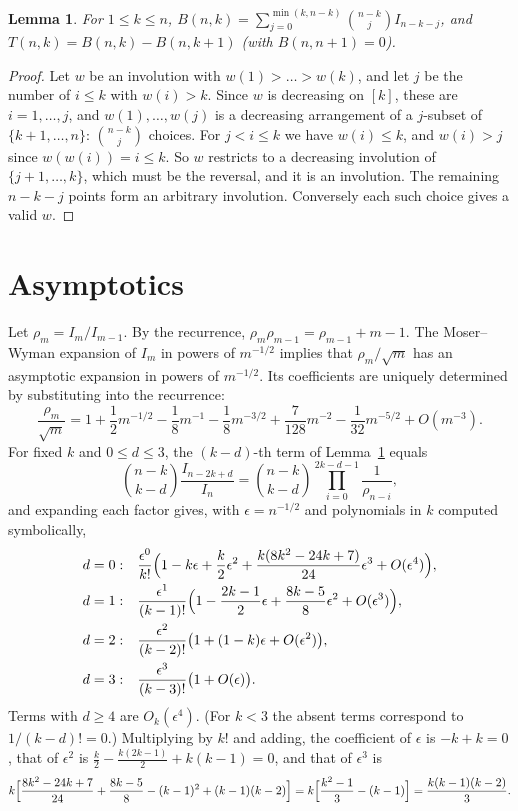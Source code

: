 \documentclass[11pt,a4paper]{article}
\newtheorem{lemma}[theorem]{Lemma}
\theoremstyle{remark}
\begin{document}
\begin{lemma}\label{lem:formula}
For $1\le k\le n$, $\displaystyle B(n,k)=\sum_{j=0}^{\min(k,n-k)}\binom{n-k}{j}I_{n-k-j}$, and $T(n,k)=B(n,k)-B(n,k+1)$ (with $B(n,n+1)=0$).
\end{lemma}

\begin{proof}
Let $w$ be an involution with $w(1)>\dots>w(k)$, and let $j$ be the number of $i\le k$ with $w(i)>k$. Since $w$ is decreasing on $[k]$, these are $i=1,\dots,j$, and $w(1),\dots,w(j)$ is a decreasing arrangement of a $j$-subset of $\{k+1,\dots,n\}$: $\binom{n-k}j$ choices. For $j<i\le k$ we have $w(i)\le k$, and $w(i)>j$ since $w(w(i))=i\le k$. So $w$ restricts to a decreasing involution of $\{j+1,\dots,k\}$, which must be the reversal, and it is an involution. The remaining $n-k-j$ points form an arbitrary involution. Conversely each such choice gives a valid $w$.
\end{proof}

\section{Asymptotics}

Let $\rho_m=I_m/I_{m-1}$. By the recurrence, $\rho_m\rho_{m-1}=\rho_{m-1}+m-1$. The Moser--Wyman expansion of $I_m$ in powers of $m^{-1/2}$ \cite{MW} implies that $\rho_m/\sqrt m$ has an asymptotic expansion in powers of $m^{-1/2}$. Its coefficients are uniquely determined by substituting into the recurrence:
\[
 \frac{\rho_m}{\sqrt m}=1+\frac{1}{2}m^{-1/2}-\frac18m^{-1}-\frac18m^{-3/2}+\frac7{128}m^{-2}-\frac1{32}m^{-5/2}+O(m^{-3}).
\]
For fixed $k$ and $0\le d\le3$, the $(k-d)$-th term of Lemma~\ref{lem:formula} equals
\[
 \binom{n-k}{k-d}\frac{I_{n-2k+d}}{I_n}=\binom{n-k}{k-d}\prod_{i=0}^{2k-d-1}\frac1{\rho_{n-i}},
\]
and expanding each factor gives, with $\epsilon=n^{-1/2}$ and polynomials in $k$ computed symbolically,
\begin{align*}
 d=0:&\quad \frac{\epsilon^0}{k!}\Bigl(1-k\epsilon+\frac k2\epsilon^2+\frac{k(8k^2-24k+7)}{24}\epsilon^3+O(\epsilon^4)\Bigr),\\
 d=1:&\quad \frac{\epsilon^1}{(k-1)!}\Bigl(1-\frac{2k-1}2\epsilon+\frac{8k-5}8\epsilon^2+O(\epsilon^3)\Bigr),\\
 d=2:&\quad \frac{\epsilon^2}{(k-2)!}\bigl(1+(1-k)\epsilon+O(\epsilon^2)\bigr),\\
 d=3:&\quad \frac{\epsilon^3}{(k-3)!}\bigl(1+O(\epsilon)\bigr).
\end{align*}
Terms with $d\ge4$ are $O_k(\epsilon^4)$. (For $k<3$ the absent terms correspond to $1/(k-d)!=0$.) Multiplying by $k!$ and adding, the coefficient of $\epsilon$ is $-k+k=0$, that of $\epsilon^2$ is $\frac k2-\frac{k(2k-1)}2+k(k-1)=0$, and that of $\epsilon^3$ is
\[
 k\Bigl[\frac{8k^2-24k+7}{24}+\frac{8k-5}8-(k-1)^2+(k-1)(k-2)\Bigr]=k\Bigl[\frac{k^2-1}3-(k-1)\Bigr]=\frac{k(k-1)(k-2)}3 .
\]
\end{document}
